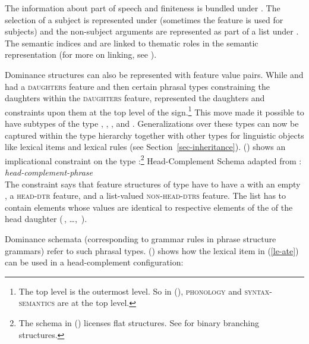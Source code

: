 \documentclass[output=paper,biblatex,babelshorthands,newtxmath,draftmode,colorlinks,citecolor=brown]{langscibook}
\begin{document}
\largerpage[2]
\noindent
The information about part of speech and finiteness is bundled under \head. The selection of a
subject is represented under \spr (sometimes the feature \subj is used for subjects) and the
non-subject arguments are represented as part of a list under \comps. The semantic indices 
and  are linked to thematic roles in the semantic representation (for more on linking, see ).

Dominance structures can also be represented with feature value pairs. While \citet{ps} and
\citet{ps2} had a \textsc{daughters} feature and then certain phrasal types constraining the
daughters within the \textsc{daughters} feature, \citet{Sag97a} represented the daughters and
constraints upon them at the top level of the sign.\footnote{ The top level is the outermost
  level. So in (), \textsc{phonology} and \textsc{syntax-semantics} are at the top level.}
This move made it possible to have subtypes of the type , \eg
{}, , and
. Generalizations over these types can now be captured within the type
hierarchy together with other types for linguistic objects like lexical items and lexical
rules (see Section~\ref{sec-inheritance}). () shows an implicational constraint on the type :\footnote{ The schema
  in () licenses flat structures. See \crossrefchapterw[\page \pageref{hcs-binary}]{order}
  for binary branching structures.  } \ea
\label{schema-bin-prel}
Head-Complement Schema adapted from :
\emph{head-complement-phrase} \impl\\
\z
The constraint says that feature structures of type  have to have a
\synsemv with an empty \compsl, a \textsc{head-dtr} feature, and a list-valued \textsc{non-head-dtrs} feature. The list has
to contain elements whose \synsem values are identical to respective elements of the \compsl
of the head daughter (\,, \ldots, \,).

\largerpage[2]
Dominance schemata (corresponding to grammar rules in phrase structure grammars) refer to such
phrasal types. () shows how the lexical item in (\ref{le-ate}) can be used in a
head-complement configuration:
\end{document}

